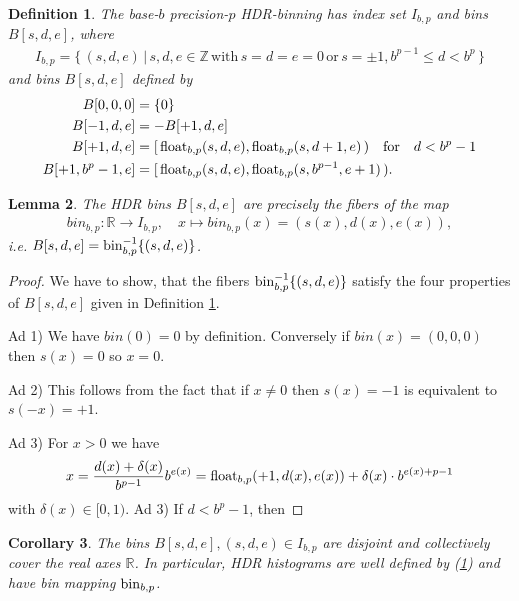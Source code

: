 \documentclass{article}
\theoremstyle{plain}
\newtheorem{definition}{Definition}[section]
\newtheorem{lemma}[definition]{Lemma}
\newtheorem{corollary}[definition]{Corollary}
\newcommand{\IR}{\mathbb{R}}
\newcommand{\IZ}{\mathbb{Z}}
\newcommand{\qtext}[1]{\quad\text{#1}\quad} %
\newcommand{\lra}{\longrightarrow}
\begin{document}
\begin{definition} \label{hdrdef}
  The base-$b$ precision-$p$ HDR-binning has index set $I_{b,p}$ and bins $B[s,d,e]$, where
  \begin{align*}
    I_{b,p} = \{\, (s,d,e) \,|\, s,d,e \in \IZ \,\text{with}\, s=d=e=0 \,\text{or}\, s=\pm1, b^{p-1} \leq d < b^p \,\}
  \end{align*}
  and bins $B[s,d,e]$ defined by
  \begin{align}
    B[0,0,0]  &= \{ 0 \} \\
    B[-1,d,e] &= -B[+1,d,e] \\
    B[+1,d,e] &= \mathopen[\,\float_{b,p}(s,d,e), \float_{b,p}(s,d+1,e)\,\mathopen) \qtext{for}  d < b^p-1 \\
    B[+1,b^p-1,e] &= \mathopen[\,\float_{b,p}(s,d,e), \float_{b,p}(s,b^{p-1},e+1)\,\mathopen).
  \end{align}
\end{definition}

\begin{lemma}
  The HDR bins $B[s,d,e]$ are precisely the fibers of the map
  \begin{align*}
    bin_{b,p}: \IR \lra I_{b,p}, \quad x \mapsto bin_{b,p}(x) = (s(x), d(x), e(x) ),
  \end{align*}
  i.e. $B[s,d,e] = \mathrm{bin}_{b,p}^{-1}\{ (s,d,e) \}$.
\end{lemma}

\begin{proof}
  We have to show, that the fibers $\mathrm{bin}_{b,p}^{-1}\{ (s,d,e) \}$ satisfy the four properties
  of $B[s,d,e]$ given in Definition \ref{hdrdef}.

  Ad 1) We have $bin(0) = 0$ by definition. Conversely if $bin(x) = (0,0,0)$ then $s(x) = 0$ so $x = 0$.

  Ad 2) This follows from the fact that if $x \neq 0$ then $s(x) = -1$ is equivalent to $s(-x) = +1$.

  Ad 3) For $x>0$ we have
  \begin{align*}
    x =  \frac{d(x) + \delta(x)}{b^{p-1}} b^{e(x)} = \mathrm{float}_{b,p}(+1,d(x), e(x)) + \delta(x) \cdot b^{e(x)+p-1}
  \end{align*}
  with $\delta(x) \in [0,1)$.
  Ad 3) If $d < b^p - 1$, then
\end{proof}

\begin{corollary}
  The bins $B[s,d,e], (s,d,e) \in I_{b,p}$ are disjoint and collectively cover the real axes $\IR$.
  In particular, HDR histograms are well defined by (\ref{hdrdef}) and have bin mapping $\mathrm{bin}_{b,p}$.
\end{corollary}
\end{document}
